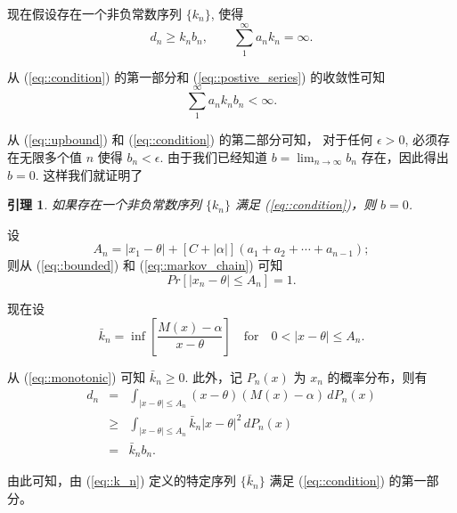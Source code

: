 \documentclass{article}
\newtheorem{lemma}{引理}
\begin{document}
现在假设存在一个非负常数序列 $\{k_n\}$, 使得
\begin{equation}
    \label{eq::condition}
    d_n \geq k_n b_n, \qquad \sum_{1}^{\infty} a_n k_n = \infty.
\end{equation}

从 (\ref{eq::condition}) 的第一部分和 (\ref{eq::postive_series}) 的收敛性可知
\begin{equation}
    \label{eq::upbound}
    \sum_{1}^{\infty} a_n k_n b_n < \infty.
\end{equation}

从 (\ref{eq::upbound}) 和 (\ref{eq::condition}) 的第二部分可知，
对于任何 $\epsilon > 0$, 必须存在无限多个值 $n$ 使得 $b_n < \epsilon$. 
由于我们已经知道 $b = \lim_{n \to \infty} b_n$ 存在，因此得出 $b = 0$. 
这样我们就证明了

\begin{lemma}
如果存在一个非负常数序列 $\{k_n\}$ 满足 (\ref{eq::condition})，则 $b = 0$.    
\end{lemma}

设
\begin{equation}
    A_n = |x_1 - \theta| + [C + |\alpha|](a_1 + a_2 + \cdots + a_{n-1});
\end{equation}
则从 (\ref{eq::bounded}) 和 (\ref{eq::markov_chain}) 可知
\begin{equation}
    Pr[|x_n - \theta| \leq A_n] = 1.
\end{equation}

现在设
\begin{equation}
    \label{eq::k_n}
    \bar{k}_n = \inf \left[ \frac{M(x) 
    - \alpha}{x - \theta} \right] \quad \text{for} \quad 
    0 < |x - \theta| \leq A_n.
\end{equation}

从 (\ref{eq::monotonic}) 可知 $\bar{k}_n \geq 0$. 
此外，记 $P_n(x)$ 为 $x_n$ 的概率分布，则有
\begin{equation}
    \begin{array}{rcl}
    d_n &=& \int_{|x-\theta| \leq A_n} (x - \theta)(M(x) - \alpha) \, dP_n(x) \\
        &\geq& \int_{|x-\theta| \leq A_n} \bar{k}_n |x - \theta|^2 \, dP_n(x) \\
        &=& \bar{k}_n b_n.
    \end{array}
\end{equation}

由此可知，由 (\ref{eq::k_n}) 定义的特定序列 $\{\bar{k}_n\}$ 满足 (\ref{eq::condition}) 
的第一部分。
\end{document}
